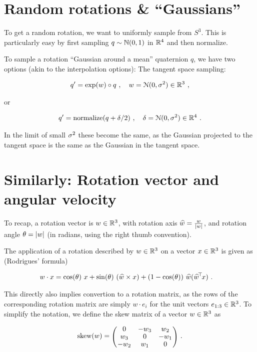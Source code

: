 \section{Random rotations \& ``Gaussians''}

To get a random rotation, we want to uniformly sample from $S^3$. This
is particularly easy by first sampling $q\sim{\mathbb{N}}(0,1)$ in ${\mathbb{R}}^4$
and then normalize.

To sample a rotation ``Gaussian around a mean'' quaternion $q$, we
have two options (akin to the interpolation options): The tangent
space sampling:

$$\begin{align}
q' = \exp(w) \circ q~,\quad w = {\cal N}(0,\sigma^2) \in {\mathbb{R}}^3 ~,
\end{align}$$

or

$$\begin{align}
q' = \text{normalize}(q + \delta/2)~,\quad \delta = {\cal N}(0,\sigma^2) \in {\mathbb{R}}^4 ~.
\end{align}$$

In the limit of small $\sigma^2$ these become the same, as the Gaussian
projected to the tangent space is the same as the Gaussian in the
tangent space.

\appendix
\section{Similarly: Rotation vector and angular velocity}

To recap, a rotation vector is $w\in{\mathbb{R}}^3$, with rotation axis $\widehat w
= \frac{w}{|w|}$, and rotation angle $\theta = |w|$ (in
radians, using the right thumb convention).

The application of a rotation described by $w\in{\mathbb{R}}^3$ on a vector
$x\in{\mathbb{R}}^3$ is given as (Rodrigues' formula)

$$\begin{align}
w \cdot x
 &= \cos(\theta)~ x
  + \sin(\theta)~ (\widehat w\times x)
  + (1-\cos(\theta))~ \widehat w(\widehat w^{\!\top\!} x) ~.
\end{align}$$

This directly also implies convertion to a rotation matrix, as the
rows of the corresponding rotation matrix are simply $w \cdot e_i$ for
the unit vectors $e_{1:3}\in{\mathbb{R}}^3$. To simplify the notation, we
define the skew matrix of a vector $w\in{\mathbb{R}}^3$ as

$$\begin{align}
\skew(w) = \mat{ccc}{0 & -w_3 & w_2 \\ w_3 & 0 & -w_1 \\ -w_2 & w_1 & 0} ~.
\end{align}$$

